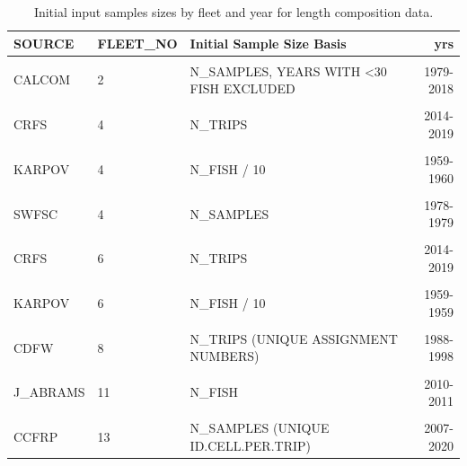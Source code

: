 \documentclass[
  english,
  a4paper,
]{article}
\begin{document}
\begin{table}

\caption{\label{tab:length-inputN}Initial input samples sizes by fleet and year for length composition data.}
\centering
\fontsize{10}{12}\selectfont
\begin{tabular}[t]{lllr}
\toprule
SOURCE & FLEET\_NO & Initial Sample Size Basis & yrs\\
\midrule
\cellcolor{gray!6}{CALCOM} & \cellcolor{gray!6}{1} & \cellcolor{gray!6}{N\_SAMPLES, YEARS WITH <30 FISH EXCLUDED} & \cellcolor{gray!6}{1978-2020}\\
CALCOM & 2 & N\_SAMPLES, YEARS WITH <30 FISH EXCLUDED & 1979-2018\\
\cellcolor{gray!6}{CALCOM} & \cellcolor{gray!6}{3} & \cellcolor{gray!6}{N\_SAMPLES, YEARS WITH <30 FISH EXCLUDED} & \cellcolor{gray!6}{1987-1998}\\
CRFS & 4 & N\_TRIPS & 2014-2019\\
\cellcolor{gray!6}{CRFS} & \cellcolor{gray!6}{4} & \cellcolor{gray!6}{N\_TRIPS ESTIMATED FROM AVG. FISH/TRIP} & \cellcolor{gray!6}{2004-2013}\\
KARPOV & 4 & N\_FISH / 10 & 1959-1960\\
\cellcolor{gray!6}{MRFSS} & \cellcolor{gray!6}{4} & \cellcolor{gray!6}{N\_TRIPS ESTIMATED FROM B. SOPER ALGORITHM} & \cellcolor{gray!6}{1980-2003}\\
SWFSC & 4 & N\_SAMPLES & 1978-1979\\
\cellcolor{gray!6}{CRFS} & \cellcolor{gray!6}{5} & \cellcolor{gray!6}{N\_FISH, YEARS WITH <10 FISH EXCLUDED} & \cellcolor{gray!6}{2003-2019}\\
CRFS & 6 & N\_TRIPS & 2014-2019\\
\cellcolor{gray!6}{CRFS} & \cellcolor{gray!6}{6} & \cellcolor{gray!6}{N\_TRIPS ESTIMATED FROM AVG. FISH/TRIP} & \cellcolor{gray!6}{2004-2013}\\
KARPOV & 6 & N\_FISH / 10 & 1959-1959\\
\cellcolor{gray!6}{MRFSS} & \cellcolor{gray!6}{6} & \cellcolor{gray!6}{N\_TRIPS ESTIMATED FROM B. SOPER ALGORITHM} & \cellcolor{gray!6}{1980-2003}\\
CDFW & 8 & N\_TRIPS (UNIQUE ASSIGNMENT NUMBERS) & 1988-1998\\
\cellcolor{gray!6}{NWFSC} & \cellcolor{gray!6}{9} & \cellcolor{gray!6}{EFFECTIVE N  BASED ON STEWART \& HAMEL (2014)} & \cellcolor{gray!6}{2003-2019}\\
J\_ABRAMS & 11 & N\_FISH & 2010-2011\\
\cellcolor{gray!6}{SWFSC} & \cellcolor{gray!6}{12} & \cellcolor{gray!6}{N\_SAMPLES (NUMBER OF HAULS)} & \cellcolor{gray!6}{2002-2016}\\
CCFRP & 13 & N\_SAMPLES (UNIQUE ID.CELL.PER.TRIP) & 2007-2020\\
\bottomrule
\end{tabular}
\end{table}
\end{document}
